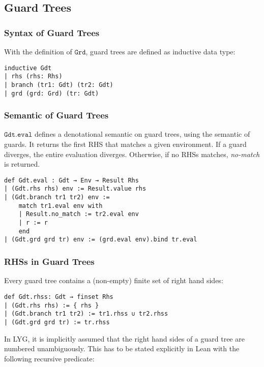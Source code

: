 \subsection{Guard Trees}\label{chap:formalGuardTrees}

\subsubsection{Syntax of Guard Trees}

With the definition of $\mathtt{Grd}$, guard trees are defined as inductive data type:

\begin{verbatim}
inductive Gdt
| rhs (rhs: Rhs)
| branch (tr1: Gdt) (tr2: Gdt)
| grd (grd: Grd) (tr: Gdt)
\end{verbatim}

\subsubsection{Semantic of Guard Trees}

$\mathtt{Gdt.eval}$ defines a denotational semantic on guard trees, using the semantic of guards.
It returns the first RHS that matches a given environment. If a guard diverges, the entire evaluation diverges. Otherwise, if no RHSs matches, \textit{no-match} is returned.

\begin{verbatim}
def Gdt.eval : Gdt → Env → Result Rhs
| (Gdt.rhs rhs) env := Result.value rhs
| (Gdt.branch tr1 tr2) env :=
    match tr1.eval env with
    | Result.no_match := tr2.eval env
    | r := r
    end
| (Gdt.grd grd tr) env := (grd.eval env).bind tr.eval
\end{verbatim}

\subsubsection{RHSs in Guard Trees}

Every guard tree contains a (non-empty) finite set of right hand sides:
\begin{verbatim}
def Gdt.rhss: Gdt → finset Rhs
| (Gdt.rhs rhs) := { rhs }
| (Gdt.branch tr1 tr2) := tr1.rhss ∪ tr2.rhss
| (Gdt.grd grd tr) := tr.rhss
\end{verbatim}

In LYG, it is implicitly assumed that the right hand sides of a guard tree are numbered unambiguously.
This has to be stated explicitly in Lean with the following recursive predicate:

